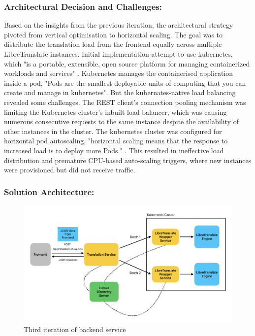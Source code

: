 \subsubsection{Architectural Decision and Challenges:} Based on the insights from the previous iteration, the architectural strategy pivoted from vertical optimisation to horizontal scaling. The goal was to distribute the translation load from the frontend equally across multiple LibreTranslate instances. Initial implementation attempt to use kubernetes, which "is a portable, extensible, open source platform for managing containerized workloads and services" \cite{kubernetes_overview}\cite{burns2022kubernetes}. Kubernetes manages the containerised application inside a pod, "Pods are the smallest deployable units of computing that you can create and manage in kubernetes"\cite{kubernetes_pods}. But the kubernates-native load balancing revealed some challenges. The REST client's connection pooling mechanism was limiting the Kubernetes cluster's inbuilt load balancer\cite{kubernetes_services_networking}\cite{redhat_kubernetes_cluster}, which was causing numerous consecutive requests to the same instance despite the availability of other instances in the cluster\cite{expedia_load_distribution}\cite{pubsapient_uneven_distribution}. 
The kubernetes cluster was configured for horizontal pod autoscaling, "horizontal scaling means that the response to increased load is to deploy more Pods." \cite{kubernetes_horizontal_pod_autoscaling}.
This resulted in ineffective load distribution and premature CPU-based auto-scaling triggers, where new instances were provisioned but did not receive traffic.

\subsubsection{Solution Architecture:}
\begin{figure}[H]
    \centering
    \includegraphics[width=1\linewidth]{chapter/05_implementation/backend/B_architectural_design/Backend_Iteration_3.pdf}
    \caption{Third iteration of backend service}
    \label{fig:backend_iteration_3}
\end{figure}

